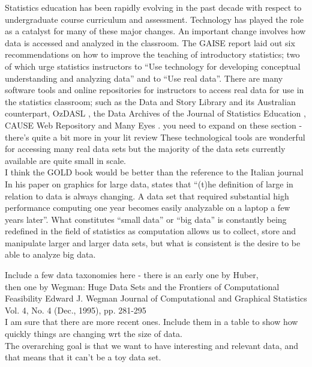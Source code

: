 \documentclass{article}\usepackage[]{graphicx}\usepackage[]{color}
\newcommand{\hh}[1]{{\color{ForestGreen} #1}}
\begin{document}
Statistics education has been rapidly evolving in the past decade with respect to undergraduate course curriculum and assessment. Technology has played the role as a catalyst for many of these major changes.  An important change involves how data is accessed and analyzed in the classroom.   The GAISE report \citep{GAISEcollege} laid out six recommendations on how to improve the teaching of introductory statistics; two of which urge statistics instructors to ``Use technology for developing conceptual understanding and analyzing data'' and to ``Use real data''.   There are many software tools and online repositories for instructors to access real data for use in the statistics classroom; such as the Data and Story Library \citep[DASL, ][]{DASL} and its Australian counterpart, OzDASL \citep{OzDASL}, the Data Archives of the Journal of Statistics Education \citep{JSErepo}, CAUSE Web Repository \citep{CAUSErepo}  and Many Eyes \citep{ManyEyes}. \hh{you need to expand on these section - there's quite a bit more in your lit review}  These technological tools are wonderful for accessing many real data sets but the majority of the data sets currently available are quite small in scale.\\

\hh{I think the GOLD book would be better than the reference to the Italian journal} In his paper on graphics for large data,  \citet[][p.~129]{Unwin1999} states that ``(t)he definition of large in relation to data is always changing. A data set that required substantial high performance computing one year becomes easily analyzable on a laptop a few years later''. What constitutes ``small data'' or ``big data'' is constantly being redefined in the field of statistics as computation allows us to collect, store and manipulate larger and larger data sets, but what is consistent is the desire to be able to analyze big data. 

\hh{Include a few data taxonomies here - there is an early one by Huber, \\
then one by Wegman: Huge Data Sets and the Frontiers of Computational Feasibility
Edward J. Wegman
Journal of Computational and Graphical Statistics
Vol. 4, No. 4 (Dec., 1995), pp. 281-295\\
I am sure that there are more recent ones. Include them in a table to show how quickly things are changing wrt the size of data.\\
The overarching goal is that we want to have interesting and relevant data, and that means that it can't be a toy data set.
}
\end{document}
